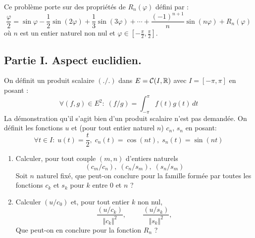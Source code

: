 Ce problème porte sur des propriétés de $R_n(\varphi)$ défini par :
\begin{displaymath}
 \frac{\varphi}{2} =\sin \varphi - \frac{1}{2}\sin (2\varphi) + \frac{1}{3}\sin (3\varphi) +\cdots + \frac{(-1)^{n+1}}{n}\sin (n\varphi) + R_n(\varphi)
\end{displaymath}
où $n$ est un entier naturel non nul et $\varphi \in [-\frac{\pi}{2},\frac{\pi}{2}]$.

\subsection*{Partie I. Aspect euclidien.}
On définit un produit scalaire $(./ .)$ dans $E=\mathcal{C}(I,\mathbb{R})$ avec $I=[-\pi,\pi]$ en posant :
\begin{displaymath}
 \forall (f,g)\in E^2:\; (f/ g) = \int_{-\pi}^{\pi}f(t)g(t)\,dt
\end{displaymath}
La démonstration qu'il s'agit bien d'un produit scalaire n'est pas demandée.\newline
On définit les fonctions $u$ et (pour tout entier naturel $n$) $c_n$, $s_n$ en posant:
\begin{displaymath}
 \forall t\in I:\; u(t) = \frac{t}{2}, \; c_n(t)=\cos(nt), \; s_n(t)=\sin(nt)
\end{displaymath}
\begin{enumerate}
 \item Calculer, pour tout couple $(m,n)$ d'entiers naturels
\begin{displaymath}
 (c_m / c_n), \; (c_n / s_m), \; (s_n / s_m)
\end{displaymath}
Soit $n$ naturel fixé, que peut-on conclure pour la famille formée par toutes les fonctions $c_k$ et $s_k$ pour  $k$ entre 0 et $n$ ?

\item Calculer $(u/c_0)$ et, pour tout entier $k$ non nul,
\begin{displaymath}
\frac{(u / c_k)}{\Vert c_k \Vert^2},\hspace{1cm} \frac{(u / s_k)}{\Vert s_k \Vert^2}, 
\end{displaymath}
Que peut-on en conclure pour la fonction $R_n$ ?
\end{enumerate}

